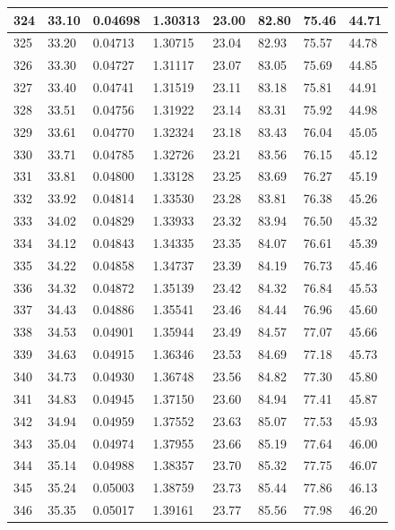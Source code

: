 \documentclass[12pt,a4paper,twoside]{article}
\begin{document}
\begin{center}
\begin{longtable}{l l l l | l l l l}
324 & 33.10 & 0.04698 & 1.30313 & 23.00 & 82.80 & 75.46 & 44.71 \\ \hline
325 & 33.20 & 0.04713 & 1.30715 & 23.04 & 82.93 & 75.57 & 44.78 \\ \hline
326 & 33.30 & 0.04727 & 1.31117 & 23.07 & 83.05 & 75.69 & 44.85 \\ \hline
327 & 33.40 & 0.04741 & 1.31519 & 23.11 & 83.18 & 75.81 & 44.91 \\ \hline
328 & 33.51 & 0.04756 & 1.31922 & 23.14 & 83.31 & 75.92 & 44.98 \\ \hline
329 & 33.61 & 0.04770 & 1.32324 & 23.18 & 83.43 & 76.04 & 45.05 \\ \hline
330 & 33.71 & 0.04785 & 1.32726 & 23.21 & 83.56 & 76.15 & 45.12 \\ \hline
331 & 33.81 & 0.04800 & 1.33128 & 23.25 & 83.69 & 76.27 & 45.19 \\ \hline
332 & 33.92 & 0.04814 & 1.33530 & 23.28 & 83.81 & 76.38 & 45.26 \\ \hline
333 & 34.02 & 0.04829 & 1.33933 & 23.32 & 83.94 & 76.50 & 45.32 \\ \hline
334 & 34.12 & 0.04843 & 1.34335 & 23.35 & 84.07 & 76.61 & 45.39 \\ \hline
335 & 34.22 & 0.04858 & 1.34737 & 23.39 & 84.19 & 76.73 & 45.46 \\ \hline
336 & 34.32 & 0.04872 & 1.35139 & 23.42 & 84.32 & 76.84 & 45.53 \\ \hline
337 & 34.43 & 0.04886 & 1.35541 & 23.46 & 84.44 & 76.96 & 45.60 \\ \hline
338 & 34.53 & 0.04901 & 1.35944 & 23.49 & 84.57 & 77.07 & 45.66 \\ \hline
339 & 34.63 & 0.04915 & 1.36346 & 23.53 & 84.69 & 77.18 & 45.73 \\ \hline
340 & 34.73 & 0.04930 & 1.36748 & 23.56 & 84.82 & 77.30 & 45.80 \\ \hline
341 & 34.83 & 0.04945 & 1.37150 & 23.60 & 84.94 & 77.41 & 45.87 \\ \hline
342 & 34.94 & 0.04959 & 1.37552 & 23.63 & 85.07 & 77.53 & 45.93 \\ \hline
343 & 35.04 & 0.04974 & 1.37955 & 23.66 & 85.19 & 77.64 & 46.00 \\ \hline
344 & 35.14 & 0.04988 & 1.38357 & 23.70 & 85.32 & 77.75 & 46.07 \\ \hline
345 & 35.24 & 0.05003 & 1.38759 & 23.73 & 85.44 & 77.86 & 46.13 \\ \hline
346 & 35.35 & 0.05017 & 1.39161 & 23.77 & 85.56 & 77.98 & 46.20 \\ \hline

\end{longtable}
\end{center}
\end{document}
